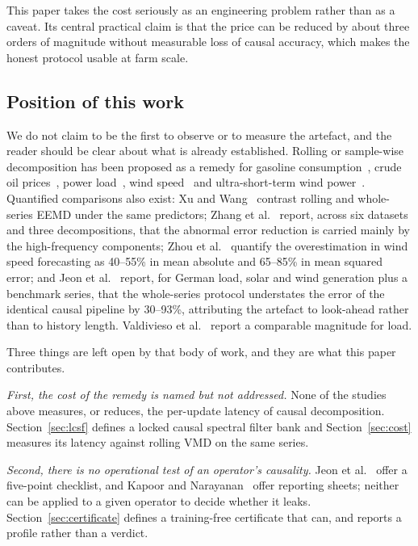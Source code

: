 \documentclass[review,3p,times]{elsarticle}
\begin{document}
This paper takes the cost seriously as an engineering problem rather than as a
caveat. Its central practical claim is that the price can be reduced by about
three orders of magnitude without measurable loss of causal accuracy, which
makes the honest protocol usable at farm scale.

\subsection{Position of this work}\label{sec:position}

We do not claim to be the first to observe or to measure the artefact, and the
reader should be clear about what is already established. Rolling or
sample-wise decomposition has been proposed as a remedy for gasoline
consumption~\cite{yu2021}, crude oil prices~\cite{xu2023}, power
load~\cite{xuA2025,wangj2024}, wind speed~\cite{wang2024,yangD2024,tan2025,pang2026,zhou2024}
and ultra-short-term wind power~\cite{huo2024}. Quantified comparisons also
exist: Xu and Wang~\cite{xu2023} contrast rolling and whole-series EEMD under
the same predictors; Zhang et al.~\cite{zhang2025} report, across six datasets
and three decompositions, that the abnormal error reduction is carried mainly
by the high-frequency components; Zhou et al.~\cite{zhou2024} quantify the
overestimation in wind speed forecasting as 40--55\% in mean absolute and
65--85\% in mean squared error; and Jeon et al.~\cite{jeon2026} report, for
German load, solar and wind generation plus a benchmark series, that the
whole-series protocol understates the error of the identical causal pipeline
by 30--93\%, attributing the artefact to look-ahead rather than to history
length. Valdivieso et al.~\cite{valdivieso2026} report a comparable magnitude
for load.

Three things are left open by that body of work, and they are what this paper
contributes.

\emph{First, the cost of the remedy is named but not addressed.} None of the
studies above measures, or reduces, the per-update latency of causal
decomposition. Section~\ref{sec:lcsf} defines a locked causal spectral filter
bank and Section~\ref{sec:cost} measures its latency against rolling VMD on
the same series.

\emph{Second, there is no operational test of an operator's causality.}
Jeon et al.~\cite{jeon2026} offer a five-point checklist, and Kapoor and
Narayanan~\cite{kapoor2023} offer reporting sheets; neither can be applied to
a given operator to decide whether it leaks. Section~\ref{sec:certificate}
defines a training-free certificate that can, and reports a profile rather
than a verdict.
\end{document}
